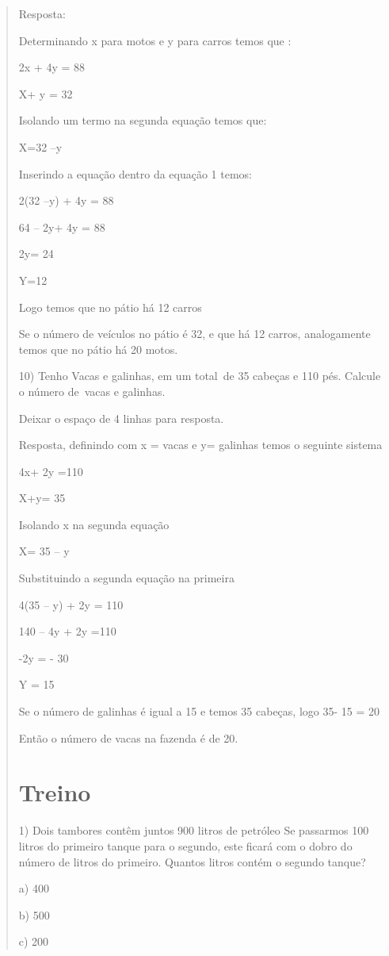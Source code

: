 \begin{quote}
\begin{escolha}
Resposta:

Determinando x para motos e y para carros temos que :

2x + 4y = 88

X+ y = 32

Isolando um termo na segunda equação temos que:

X=32 --y

Inserindo a equação dentro da equação 1 temos:

2(32 --y) + 4y = 88

64 -- 2y+ 4y = 88

2y= 24

Y=12

Logo temos que no pátio há 12 carros

Se o número de veículos no pátio é 32, e que há 12 carros, analogamente
temos que no pátio há 20 motos.

10) Tenho Vacas e galinhas, em um total~de 35 cabeças e 110 pés. Calcule
o número de~vacas e galinhas.

Deixar o espaço de 4 linhas para resposta.

Resposta, definindo com x = vacas e y= galinhas temos o seguinte sistema

4x+ 2y =110

X+y= 35

Isolando x na segunda equação

X= 35 -- y

Substituindo a segunda equação na primeira

4(35 -- y) + 2y = 110

140 -- 4y + 2y =110

-2y = - 30

Y = 15

Se o número de galinhas é igual a 15 e temos 35 cabeças, logo 35- 15 =
20

Então o número de vacas na fazenda é de 20.

\section{Treino}

1) Dois tambores contêm juntos 900 litros de petróleo Se passarmos 100
litros do primeiro tanque para o segundo, este ficará com o dobro do
número de litros do primeiro. Quantos litros contém o segundo tanque?

a) 400

b) 500

c) 200


\end{escolha}
\end{quote}
